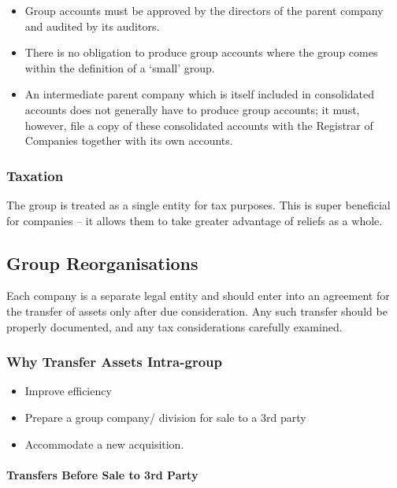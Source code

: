 \documentclass[
]{article}
\providecommand{\tightlist}{%
  \setlength{\itemsep}{0pt}\setlength{\parskip}{0pt}}
\begin{document}
\begin{itemize}
\tightlist
\item
  Group accounts must be approved by the directors of the parent company
  and audited by its auditors.
\item
  There is no obligation to produce group accounts where the group comes
  within the definition of a `small' group.
\item
  An intermediate parent company which is itself included in
  consolidated accounts does not generally have to produce group
  accounts; it must, however, file a copy of these consolidated accounts
  with the Registrar of Companies together with its own accounts.
\end{itemize}

\hypertarget{taxation}{%
\subsubsection{Taxation}\label{taxation}}

The group is treated as a single entity for tax purposes. This is super
beneficial for companies -- it allows them to take greater advantage of
reliefs as a whole.

\hypertarget{group-reorganisations-1}{%
\subsection{Group Reorganisations}\label{group-reorganisations-1}}

Each company is a separate legal entity and should enter into an
agreement for the transfer of assets only after due consideration. Any
such transfer should be properly documented, and any tax considerations
carefully examined.

\hypertarget{why-transfer-assets-intra-group}{%
\subsubsection{Why Transfer Assets
Intra-group}\label{why-transfer-assets-intra-group}}

\begin{itemize}
\tightlist
\item
  Improve efficiency
\item
  Prepare a group company/ division for sale to a 3rd party
\item
  Accommodate a new acquisition.
\end{itemize}

\hypertarget{transfers-before-sale-to-3rd-party}{%
\paragraph{Transfers Before Sale to 3rd
Party}\label{transfers-before-sale-to-3rd-party}}
\end{document}

